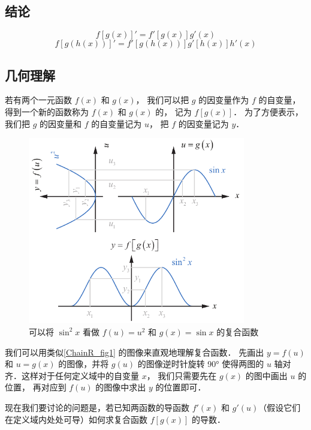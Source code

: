 

\subsection{结论}
\begin{equation}
f[g(x)]' = f'[g(x)]g'(x)
\end{equation}
\begin{equation}
f[g(h(x))]' = f'[g(h(x))]g'[h(x)]h'(x)
\end{equation}

\subsection{几何理解}
若有两个一元函数 $f(x)$ 和 $g(x)$， 我们可以把 $g$ 的因变量作为 $f$ 的自变量， 得到一个新的函数称为 $f(x)$ 和 $g(x)$ 的， 记为 $f[g(x)]$． 为了方便表示，我们把 $g$ 的因变量和 $f$ 的自变量记为 $u$， 把 $f$ 的因变量记为 $y$．

\begin{figure}[ht]
\centering
\includegraphics[width=9.5cm]{./figures/ChainR1.pdf}
\caption{可以将 $\sin^2 x$ 看做 $f(u) = u^2$ 和 $g(x) = \sin x$ 的复合函数}\label{ChainR_fig1}
\end{figure}

我们可以用类似\autoref{ChainR_fig1} 的图像来直观地理解复合函数． 先画出 $y = f(u)$ 和 $u = g(x)$ 的图像，并将 $g(u)$ 的图像逆时针旋转 90° 使得两图的 $u$ 轴对齐．这样对于任何定义域中的自变量 $x$， 我们只需要先在 $g(x)$ 的图中画出 $u$ 的位置， 再对应到 $f(u)$ 的图像中求出 $y$ 的位置即可． 

现在我们要讨论的问题是，若已知两函数的导函数 $f'(x)$ 和 $g'(u)$（假设它们在定义域内处处可导）如何求复合函数 $f[g(x)]$ 的导数．

